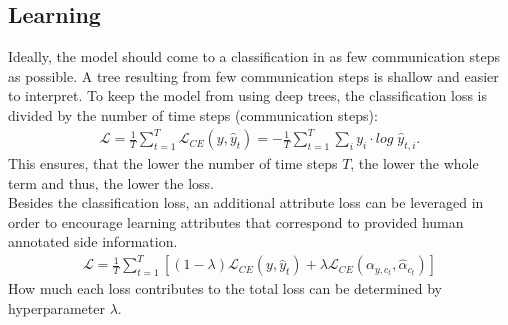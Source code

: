 \documentclass[a4paper,cleardoubleempty,BCOR1cm, 11pt]{report}
\begin{document}
\subsection{Learning}
Ideally, the model should come to a classification in as few communication steps as possible. A tree resulting from few communication steps is shallow and easier to interpret. To keep the model from using deep trees, the classification loss is divided by the number of time steps (communication steps):
\begin{align}
	\mathcal{L} = \frac{1}{T} \sum_{t=1}^{T}\mathcal{L}_{CE}(y, \hat{y}_t) = - \frac{1}{T}\sum_{t=1}^{T}\sum_{i}y_i \cdot log\;\hat{y}_{t,i}.
\end{align}
This ensures, that the lower the number of time steps $T$, the lower the whole term and thus, the lower the loss.\\
Besides the classification loss, an additional attribute loss can be leveraged in order to encourage learning attributes that correspond to provided human annotated side information.
\begin{align}
	\mathcal{L} = \frac{1}{T}\sum_{t=1}^{T}\left[(1-\lambda)\mathcal{L}_{CE}(y,\hat{y}_t) + \lambda \mathcal{L}_{CE}(\alpha_{y,c_t},\hat{\alpha}_{c_t}) \right]
\end{align}
How much each loss contributes to the total loss can be determined by hyperparameter $\lambda$.
\end{document}

